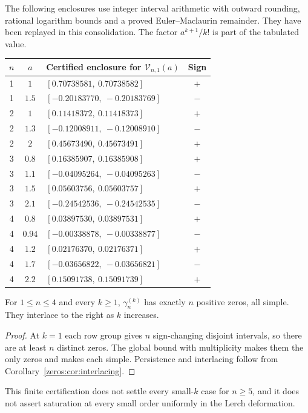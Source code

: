 The following enclosures use integer interval arithmetic with outward
rounding, rational logarithm bounds and a proved Euler--Maclaurin remainder.
They have been replayed in this consolidation. The factor $a^{k+1}/k!$
is part of the tabulated value.
\begin{center}
\begin{tabular}{cclc}
\toprule
$n$ & $a$ & Certified enclosure for $\mathcal V_{n,1}(a)$ & Sign\\
\midrule
1 & $1$ & $[0.70738581,\ 0.70738582]$ & $+$\\
1 & $1.5$ & $[-0.20183770,\ -0.20183769]$ & $-$\\
2 & $1$ & $[0.11418372,\ 0.11418373]$ & $+$\\
2 & $1.3$ & $[-0.12008911,\ -0.12008910]$ & $-$\\
2 & $2$ & $[0.45673490,\ 0.45673491]$ & $+$\\
3 & $0.8$ & $[0.16385907,\ 0.16385908]$ & $+$\\
3 & $1.1$ & $[-0.04095264,\ -0.04095263]$ & $-$\\
3 & $1.5$ & $[0.05603756,\ 0.05603757]$ & $+$\\
3 & $2.1$ & $[-0.24542536,\ -0.24542535]$ & $-$\\
4 & $0.8$ & $[0.03897530,\ 0.03897531]$ & $+$\\
4 & $0.94$ & $[-0.00338878,\ -0.00338877]$ & $-$\\
4 & $1.2$ & $[0.02176370,\ 0.02176371]$ & $+$\\
4 & $1.7$ & $[-0.03656822,\ -0.03656821]$ & $-$\\
4 & $2.2$ & $[0.15091738,\ 0.15091739]$ & $+$\\
\bottomrule
\end{tabular}
\end{center}

\begin{corollary}
For $1\le n\le4$ and every $k\ge1$, $\gamma_n^{(k)}$ has exactly $n$
positive zeros, all simple. They interlace to the right as $k$ increases.
\end{corollary}
\begin{proof}
At $k=1$ each row group gives $n$ sign-changing disjoint intervals, so
there are at least $n$ distinct zeros. The global bound with multiplicity
makes them the only zeros and makes each simple. Persistence and
interlacing follow from Corollary~\ref{zeros:cor:interlacing}.
\end{proof}
This finite certification does not settle every small-$k$ case for
$n\ge5$, and it does not assert saturation at every small order uniformly
in the Lerch deformation.

